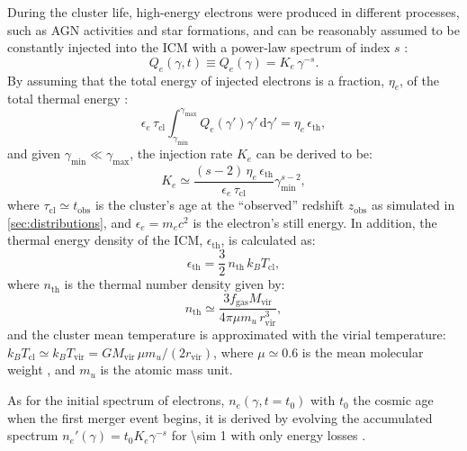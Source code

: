\documentclass[modern]{aastex61}
\newcommand{\R}[1]{\mathrm{#1}}
\newcommand{\D}[1]{\R{d} #1}
\begin{document}
During the cluster life, high-energy electrons were produced in
different processes, such as AGN activities and star formations,
and can be reasonably assumed to be constantly injected into the
ICM with a power-law spectrum of index $s$ \citep{sarazin1999}:
\begin{equation}
  \label{eq:electron-inj}
  Q_e(\gamma, t) \equiv Q_e(\gamma) = K_e \,\gamma^{-s}.
\end{equation}
By assuming that the total energy of injected electrons is a fraction,
$\eta_e$, of the total thermal energy \citep{cassano2005}:
\begin{equation}
  \epsilon_e \,\tau_{\R{cl}} \int_{\gamma_{\R{min}}}^{\gamma_{\R{max}}}
  Q_e(\gamma') \gamma' \,\D{\gamma'}
  = \eta_e \,\epsilon_{\R{th}},
\end{equation}
and given $\gamma_{\R{min}} \ll \gamma_{\R{\max}}$,
the injection rate $K_e$ can be derived to be:
\begin{equation}
  \label{eq:injrate}
  K_e \simeq \frac{(s-2)\,\eta_e\,\epsilon_{\R{th}}}{\epsilon_e\,\tau_{\R{cl}}}
    \gamma_{\R{min}}^{s-2},
\end{equation}
where $\tau_{\R{cl}} \simeq t_{\R{obs}}$ is the cluster's age at the
\enquote{observed} redshift $z_{\R{obs}}$ as simulated in \autoref{sec:distributions},
and $\epsilon_e = m_e c^2$ is the electron's still energy.
In addition, the thermal energy density of the ICM, $\epsilon_{\R{th}}$,
is calculated as:
\begin{equation}
  \label{eq:energy-density-thermal}
  \epsilon_{\R{th}} = \frac{3}{2} \,n_{\R{th}} \,k_BT_{\R{cl}},
\end{equation}
where $n_{\R{th}}$ is the thermal number density given by:
\begin{equation}
  \label{eq:number-density-thermal}
  n_{\R{th}} \simeq \frac{3 f_{\R{gas}} M_{\R{vir}}}{4\pi \mu m_u \,r^3_{\R{vir}}},
\end{equation}
and the cluster mean temperature is approximated with the virial temperature:
$k_BT_{\R{cl}} \simeq k_BT_{\R{vir}} = G M_{\R{vir}} \,\mu m_u / (2 r_{\R{vir}})$,
where $\mu \simeq 0.6$ is the mean molecular weight
\citep[e.g.,][]{ettori2013}, and $m_u$ is the atomic mass unit.

As for the initial spectrum of electrons, $n_e(\gamma, t=t_0)$ with $t_0$
the cosmic age when the first merger event begins,
it is derived by evolving the accumulated spectrum
$n_e'(\gamma) = t_0 K_e \gamma^{-s}$ for \SI{\sim 1}{\Gyr} with only energy
losses \citep[e.g.,][]{brunetti2007}.
\end{document}
